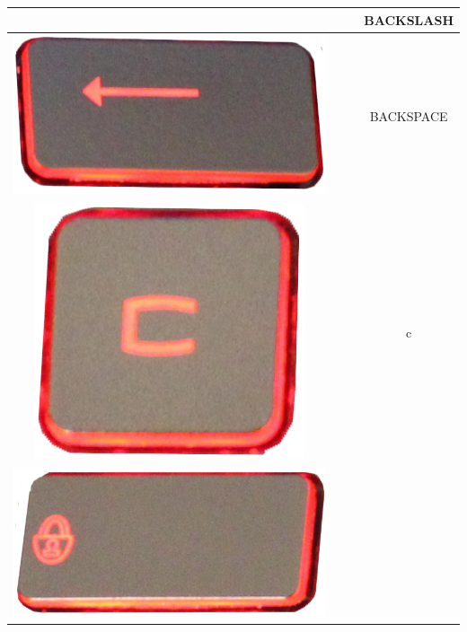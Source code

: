 \begin{longtable}{cccc}
\begin{minipage}[c]{.3\textwidth}
\vspace{0.2cm}
\end{minipage} & & & BACKSLASH\\
\hline
\begin{minipage}[c]{.3\textwidth}
\vspace{0.2cm}
\includegraphics[scale=0.1]{Images/KeyMapping/BACKSPACE}
\vspace{0.2cm}
\end{minipage} & & & BACKSPACE\\
\hline
\begin{minipage}[c]{.3\textwidth}
\vspace{0.2cm}
\includegraphics[scale=0.1]{Images/KeyMapping/c}
\vspace{0.2cm}
\end{minipage} & & & c\\
\hline
\begin{minipage}[c]{.3\textwidth}
\vspace{0.2cm}
\includegraphics[scale=0.1]{Images/KeyMapping/CAPS_LOCK}

\end{minipage}
\end{longtable}
